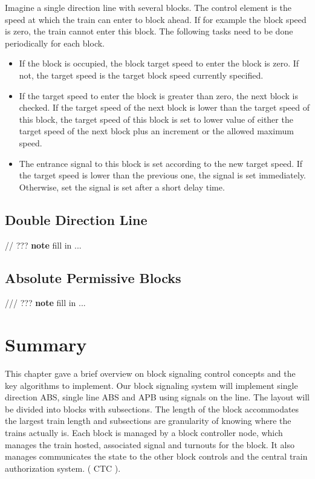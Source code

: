 Imagine a single direction line with several blocks. The control element is the speed at which the train can enter to block ahead. If for example the block speed is zero, the train cannot enter this block. The following tasks need to be done periodically for each block.
\begin{itemize}
\item If the block is occupied, the block target speed to enter the block is zero. If not, the target speed is the target block speed currently specified.
\item If the target speed to enter the block is greater than zero, the next block is checked. If the target speed of the next block is lower than the target speed of this block, the target speed of this block is set to lower value of either the target speed of the next block plus an increment or the allowed maximum speed.
\item The entrance signal to this block is set according to the new target speed. If the target speed is lower than the previous one, the signal is set immediately. Otherwise, set the signal is set after a short delay time.
\end{itemize}

\subsection{Double Direction Line}

// ??? \textbf{note} fill in ...

\subsection{Absolute Permissive Blocks}

/// ??? \textbf{note} fill in ...

\section{Summary}

This chapter gave a brief overview on block signaling control concepts and the key algorithms to implement. Our block signaling system will implement single direction ABS, single line ABS and APB using signals on the line. The layout will be divided into blocks with subsections. The length of the block accommodates the largest train length and subsections are granularity of knowing where the trains actually is. Each block is managed by a block controller node, which manages the train hosted, associated signal and turnouts for the block. It also manages communicates the state to the other block controls and the central train authorization system. ( CTC ).

